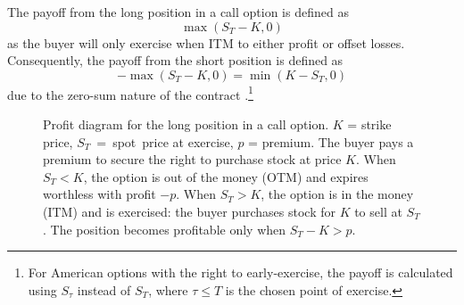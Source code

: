 \documentclass[english,12pt,a4paper,pdftex,sci,utf8]{aaltothesis}
\begin{document}
The payoff from the long position in a call option is defined as
\begin{equation}
    \max(S_T-K,0)
\label{eq:long_call_payoff}
\end{equation}
as the buyer will only exercise when ITM to either profit or offset losses. Consequently, the payoff from the short position is defined as 
\begin{equation*}
    -\max(S_T-K,0) = \min(K-S_T,0)
\end{equation*}
due to the zero-sum nature of the contract \cite{hull2018}.\footnote{For American options with the right to early-exercise, the payoff is calculated using $S_\tau$ instead of $S_T$, where $\tau \le T$ is the chosen point of exercise.}

\begin{figure}[tbp]
\centering
    \caption{Profit diagram for the long position in a call option. $K$ = strike price, \mbox{$S_T$ = spot price} at exercise, $p$ = premium. The buyer pays a premium to secure the right to purchase stock at price $K$. When $S_T < K$, the option is out of the money (OTM) and expires worthless with profit $-p$. When $S_T > K$, the option is in the money (ITM) and is exercised: the buyer purchases stock for $K$ to sell at $S_T$. The position becomes profitable only when $S_T - K > p$.}
    \label{fig:long_call_payoff}
    \vspace{0.8cm}
\end{figure}
\end{document}
